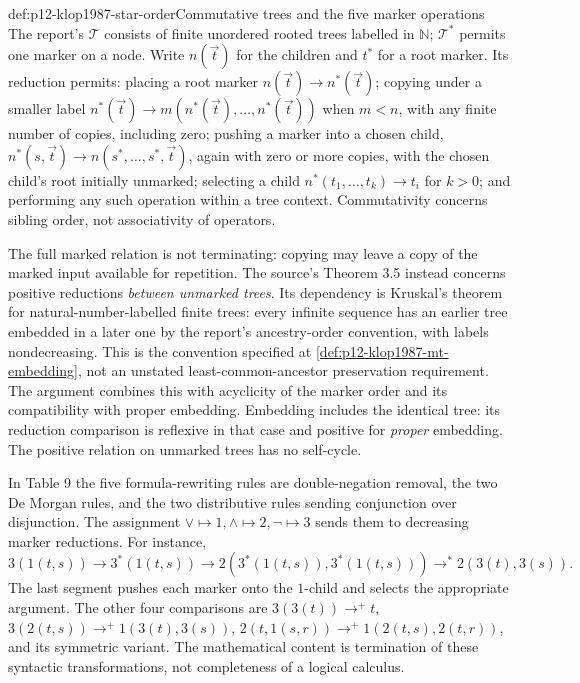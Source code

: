 \begin{hbdefinition}{def:p12-klop1987-star-order}{Commutative trees and the five marker operations}
The report's \(\mathcal T\) consists of finite unordered rooted trees
labelled in \(\mathbb N\); \(\mathcal T^*\) permits one marker on a
node. Write \(n(\vec t)\) for the children and \(t^*\) for a root
marker. Its reduction permits:
placing a root marker \(n(\vec t)\to n^*(\vec t)\);
copying under a smaller label
\(n^*(\vec t)\to m(n^*(\vec t),\ldots,n^*(\vec t))\) when \(m<n\),
with any finite number of copies, including zero;
pushing a marker into a chosen child,
\(n^*(s,\vec t)\to n(s^*,\ldots,s^*,\vec t)\), again with zero
or more copies, with the chosen child's root initially unmarked; selecting a child
\(n^*(t_1,\ldots,t_k)\to t_i\) for \(k>0\); and performing
any such operation within a tree context.
Commutativity concerns sibling order, not associativity of operators.
\end{hbdefinition}

The full marked relation is not terminating: copying may leave a copy of
the marked input available for repetition. The source's Theorem 3.5 instead
concerns positive reductions \emph{between unmarked trees}. Its dependency
is Kruskal's theorem for natural-number-labelled finite trees: every
infinite sequence has an earlier tree embedded in a later one by the
report's ancestry-order convention, with labels nondecreasing. This is
the convention specified at \cref{def:p12-klop1987-mt-embedding}, not an
unstated least-common-ancestor preservation requirement. The argument combines
this with acyclicity of the marker order and its compatibility with proper
embedding. Embedding includes the identical tree: its reduction comparison
is reflexive in that case and positive for \emph{proper} embedding.
The positive relation on unmarked trees has no self-cycle.

In Table 9 the five formula-rewriting rules are double-negation removal,
the two De Morgan rules, and the two distributive rules sending conjunction
over disjunction. The assignment \(\lor\mapsto1,\land\mapsto2,
\neg\mapsto3\) sends them to decreasing marker reductions. For instance,
\[
3(1(t,s))\to3^*(1(t,s))
\to2(3^*(1(t,s)),3^*(1(t,s)))
\to^*2(3(t),3(s)).
\]
The last segment pushes each marker onto the \(1\)-child and selects
the appropriate argument. The other four comparisons are
\(3(3(t))\to^+t\), \(3(2(t,s))\to^+1(3(t),3(s))\),
\(2(t,1(s,r))\to^+1(2(t,s),2(t,r))\), and its symmetric variant.
The mathematical content is termination of these syntactic transformations,
not completeness of a logical calculus.

